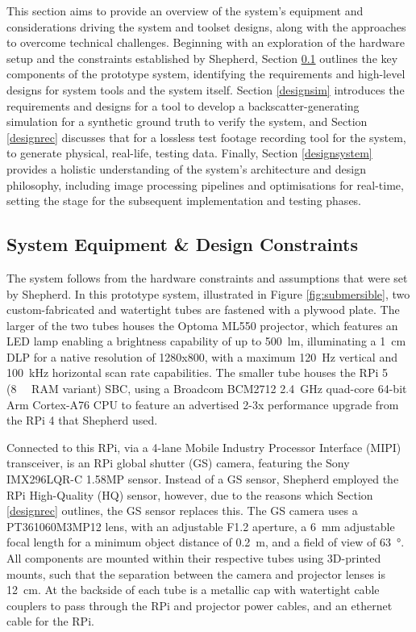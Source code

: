 This section aims to provide an overview of the system's equipment and considerations driving the system and toolset designs, along with the approaches to overcome technical challenges. Beginning with an exploration of the hardware setup and the constraints established by Shepherd, Section \ref{designconstraints} outlines the key components of the prototype system, identifying the requirements and high-level designs for system tools and the system itself. Section \ref{designsim} introduces the requirements and designs for a tool to develop a backscatter-generating simulation for a synthetic ground truth to verify the system, and Section \ref{designrec} discusses that for a lossless test footage recording tool for the system, to generate physical, real-life, testing data. Finally, Section \ref{designsystem} provides a holistic understanding of the system's architecture and design philosophy, including image processing pipelines and optimisations for real-time, setting the stage for the subsequent implementation and testing phases.

\subsection{System Equipment \& Design Constraints}
\label{designconstraints}

The system follows from the hardware constraints and assumptions that were set by Shepherd. In this prototype system, illustrated in Figure \ref{fig:submersible}, two custom-fabricated and watertight tubes are fastened with a plywood plate. The larger of the two tubes houses the Optoma ML550 projector, which features an LED lamp enabling a brightness capability of up to \SI{500}{\lumen}, illuminating a \SI{1}{\centi\metre} DLP for a native resolution of 1280x800, with a maximum \SI{120}{\hertz} vertical and \SI{100}{\kilo\hertz} horizontal scan rate capabilities. The smaller tube houses the RPi 5 (\SI{8}{\giga\byte} RAM variant) SBC, using a Broadcom BCM2712 \SI{2.4}{\giga\hertz} quad-core 64-bit Arm Cortex-A76 CPU to feature an advertised 2-3x performance upgrade from the RPi 4 that Shepherd used.

Connected to this RPi, via a 4-lane Mobile Industry Processor Interface (MIPI) transceiver, is an RPi global shutter (GS) camera, featuring the Sony IMX296LQR-C 1.58MP sensor. Instead of a GS sensor, Shepherd employed the RPi High-Quality (HQ) sensor, however, due to the reasons which Section \ref{designrec} outlines, the GS sensor replaces this. The GS camera uses a PT361060M3MP12 lens, with an adjustable F1.2 aperture, a \SI{6}{\milli\metre} adjustable focal length for a minimum object distance of \SI{0.2}{\metre}, and a field of view of \SI{63}{\degree}. All components are mounted within their respective tubes using 3D-printed mounts, such that the separation between the camera and projector lenses is \SI{12}{\centi\metre}. At the backside of each tube is a metallic cap with watertight cable couplers to pass through the RPi and projector power cables, and an ethernet cable for the RPi.

